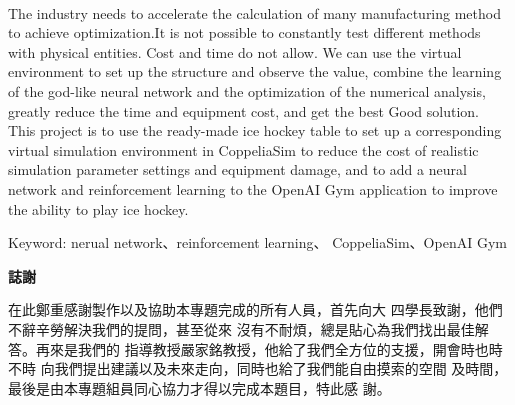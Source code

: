\documentclass[14pt,a4paper]{report}  %
\begin{document}
\begin{center}
\LARGE\textbf{}\\
\begin{flushleft}
\fontsize{14pt}{14.5pt}\selectfont\hspace{12pt} \sectionef The industry needs to accelerate the calculation of many manufacturing method to achieve optimization.It is not possible to constantly test different methods with physical entities. Cost and time do not allow. We can use the virtual environment to set up the structure and observe the value, combine the learning of the god-like neural network and the optimization of the numerical analysis, greatly reduce the time and equipment cost, and get the best Good solution.\\

\hspace{12pt} This project is to use the ready-made ice hockey table to set up a corresponding virtual simulation environment in CoppeliaSim to reduce the cost of realistic simulation parameter settings and equipment damage, and to add a neural network and reinforcement learning to the OpenAI Gym application to improve the ability to play ice hockey.
\end{flushleft}
\begin{center}
\fontsize{14pt}{14.5pt}\selectfont\sectionef Keyword:  nerual network、reinforcement learning、 CoppeliaSim、OpenAI Gym
\end{center}
\newpage
\centerline\LARGE\textbf{誌謝}\\
\begin{flushleft}
\fontsize{14pt}{2.5pt}\hspace{12pt}在此鄭重感謝製作以及協助本專題完成的所有人員，首先向大
四學長致謝，他們不辭辛勞解決我們的提問，甚至從來
沒有不耐煩，總是貼心為我們找出最佳解答。再來是我們的
指導教授嚴家銘教授，他給了我們全方位的支援，開會時也時不時
向我們提出建議以及未來走向，同時也給了我們能自由摸索的空間
及時間，最後是由本專題組員同心協力才得以完成本題目，特此感
謝。
\end{flushleft}
\newpage
\renewcommand{\contentsname}{\centerline{\fontsize{18pt}{\baselineskip}\selectfont\textbf{目\quad 錄}}}
\tableofcontents　　%
\newpage
\renewcommand{\listfigurename}{\centerline{\fontsize{18pt}{\baselineskip}\selectfont\textbf{圖\quad 表\quad 目\quad 錄 }}}
\listoffigures
\newpage
\end{center}
\end{document}
